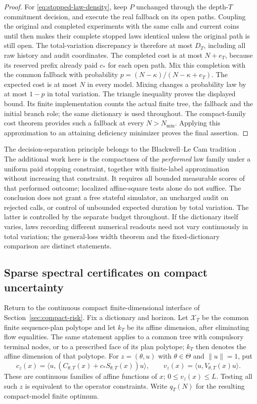 \begin{proof}
For \eqref{eq:stopped-law-density}, keep $P$ unchanged through the depth-$T$ commitment decision, and execute the real fallback on its open paths. Coupling the original and completed experiments with the same calls and current coins until then makes their complete stopped laws identical unless the original path is still open. The total-variation discrepancy is therefore at most $D_T$, including all raw history and audit coordinates. The completed cost is at most $N+e_T$, because its reserved prefix already paid $c_*$ for each open path. Mix this completion with the common fallback with probability $p=(N-\kappa)/(N-\kappa+e_T)$. The expected cost is at most $N$ in every model. Mixing changes a probability law by at most $1-p$ in total variation. The triangle inequality proves the displayed bound. Its finite implementation counts the actual finite tree, the fallback and the initial branch role; the same dictionary is used throughout. The compact-family cost theorem provides such a fallback at every $N>N_{\min}$. Applying this approximation to an attaining deficiency minimizer proves the final assertion.
\end{proof}

The decision-separation principle belongs to the Blackwell--Le Cam tradition \cite{Blackwell,Jencova16}. The additional work here is the compactness of the \emph{performed} law family under a uniform paid stopping constraint, together with finite-label approximation without increasing that constraint. It requires all bounded measurable scores of that performed outcome; localized affine-square tests alone do not suffice. The conclusion does not grant a free stateful simulator, an uncharged audit on rejected calls, or control of unbounded expected duration by total variation. The latter is controlled by the separate budget throughout. If the dictionary itself varies, laws recording different numerical readouts need not vary continuously in total variation; the general-loss width theorem and the fixed-dictionary comparison are distinct statements.

\subsection{Sparse spectral certificates on compact uncertainty}
Return to the continuous compact finite-dimensional interface of Section~\ref{sec:compact-risk}. Fix a dictionary and horizon. Let $\mathcal X_T$ be the common finite sequence-plan polytope and let $k_T$ be its affine dimension, after eliminating flow equalities. The same statement applies to a common tree with compulsory terminal nodes, or to a prescribed face of its plan polytope; $k_T$ then denotes the affine dimension of that polytope. For $z=(\theta,u)$ with $\theta\in\Theta$ and $\|u\|=1$, put
\[
 c_z(x)=\langle u,(C_{\theta,T}(x)+c_*S_{\theta,T}(x))u\rangle,
 \qquad v_z(x)=\langle u,V_{\theta,T}(x)u\rangle.
\]
These are continuous families of affine functions of $x$; $0\le v_z(x)\le L$. Testing all such $z$ is equivalent to the operator constraints. Write $q_T(N)$ for the resulting compact-model finite optimum.

